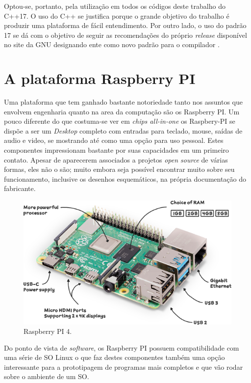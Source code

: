 Optou-se, portanto, pela utilização em todos os códigos deste trabalho do C++17. O uso do C++ se justifica
porque o grande objetivo do trabalho é produzir uma plataforma de fácil entendimento. Por outro lado, o uso do padrão 17
se dá com o objetivo de seguir as recomendações do próprio \textit{release} disponível no site da GNU designando ente como
novo padrão para o compilador \cite{gcc-5}.


\section{A plataforma Raspberry PI\textregistered}

Uma plataforma que tem ganhado bastante notoriedade tanto nos assuntos que envolvem engenharia quanto na area da computação
são os Raspberry PI. Um pouco diferente do que costuma-se ver em \textit{chips all-in-one} os Raspbery-PI se dispõe a 
ser um \textit{Desktop} completo com entradas para teclado, mouse, saídas de audio e video, se mostrando até como uma 
opção para uso pessoal. Estes componentes impressionam bastante por suas capacidades em um primeiro contato. Apesar 
de aparecerem associados a projetos \textit{open source} de várias formas, eles não o são; muito embora seja possível
encontrar muito sobre seu funcionamento, inclusive os desenhos esquemáticos, na própria documentação do fabricante. \cite{raspberry-pi}

\begin{figure}[htb]
    \begin{center}
	    \includegraphics[scale=0.5]{figs/raspberry-pi-4.png}
	\end{center}
	\caption{Raspberry PI 4.} 
\end{figure}

Do ponto de vista de \textit{software}, os Raspberry PI possuem compatibilidade com uma série de \ac{SO} Linux o que 
faz destes componentes também uma opção interessante para a prototipagem de programas mais completos e que vão rodar 
sobre o ambiente de um \ac{SO}.

